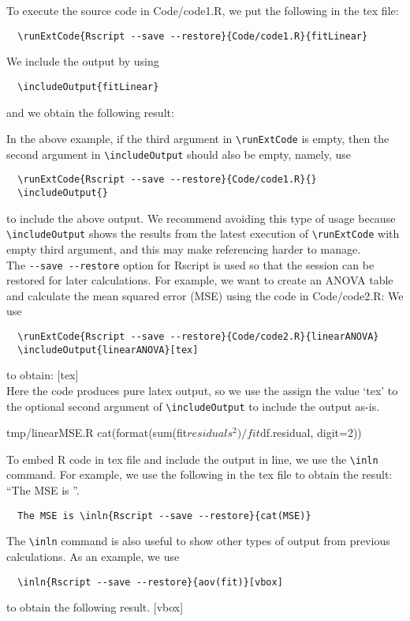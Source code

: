 \documentclass[12pt]{amsart}
\begin{document}
To execute the source code in Code/code1.R, we put the following in the tex file:
\begin{verbatim}
  \runExtCode{Rscript --save --restore}{Code/code1.R}{fitLinear}
\end{verbatim}
We include the output by using
\begin{verbatim}
  \includeOutput{fitLinear}
\end{verbatim}
and we obtain the following result:

In the above example, if the third argument in \verb|\runExtCode| is empty, then the second argument in \verb|\includeOutput| should also be empty, namely, use
\begin{verbatim}
  \runExtCode{Rscript --save --restore}{Code/code1.R}{}
  \includeOutput{}
\end{verbatim}
to include the above output. We recommend avoiding this type of usage because \verb|\includeOutput| shows the results from the latest execution of \verb|\runExtCode| with empty third argument, and this may make referencing harder to manage.\\

The \verb|--save --restore| option for Rscript is used so that the session can be restored for later calculations. For example, we want to create an ANOVA table and calculate the mean squared error (MSE) using the code in Code/code2.R:
We use
\begin{verbatim}
  \runExtCode{Rscript --save --restore}{Code/code2.R}{linearANOVA}
  \includeOutput{linearANOVA}[tex]
\end{verbatim}
to obtain:
[tex]\\
Here the code produces pure latex output, so we use the assign the value `tex' to the optional second argument of \verb|\includeOutput| to include the output as-is. \\

\begin{filecontents*}{tmp/linearMSE.R}
cat(format(sum(fit$residuals^2)/fit$df.residual, digit=2))
\end{filecontents*}
To embed R code in tex file and include the output in line, we use the \verb|\inln| command. For example, we use the following in the tex file to obtain the result: ``The MSE is ''.
\begin{verbatim}
  The MSE is \inln{Rscript --save --restore}{cat(MSE)}
\end{verbatim}
The \verb|\inln| command is also useful to show other types of output from previous calculations. As an example, we use 
\begin{verbatim}
  \inln{Rscript --save --restore}{aov(fit)}[vbox]
\end{verbatim}
to obtain the following result.
[vbox]
\end{document}
